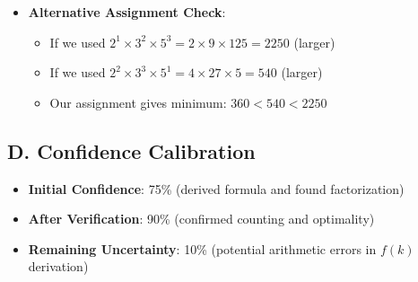 \documentclass[11pt]{article}
\begin{document}
\begin{verificationbox}
\begin{itemize}[leftmargin=*]
    \item \textbf{Alternative Assignment Check}:
    \begin{itemize}
        \item If we used $2^1 \times 3^2 \times 5^3 = 2 \times 9 \times 125 = 2250$ (larger)
        \item If we used $2^2 \times 3^3 \times 5^1 = 4 \times 27 \times 5 = 540$ (larger)
        \item Our assignment gives minimum: $360 < 540 < 2250$ \quad \checkmark
    \end{itemize}
\end{itemize}

\subsection*{D. Confidence Calibration}
\begin{itemize}[leftmargin=*]
    \item \textbf{Initial Confidence}: 75\% (derived formula and found factorization)
    \item \textbf{After Verification}: 90\% (confirmed counting and optimality)
    \item \textbf{Remaining Uncertainty}: 10\% (potential arithmetic errors in $f(k)$ derivation)
\end{itemize}
\end{verificationbox}
\end{document}
